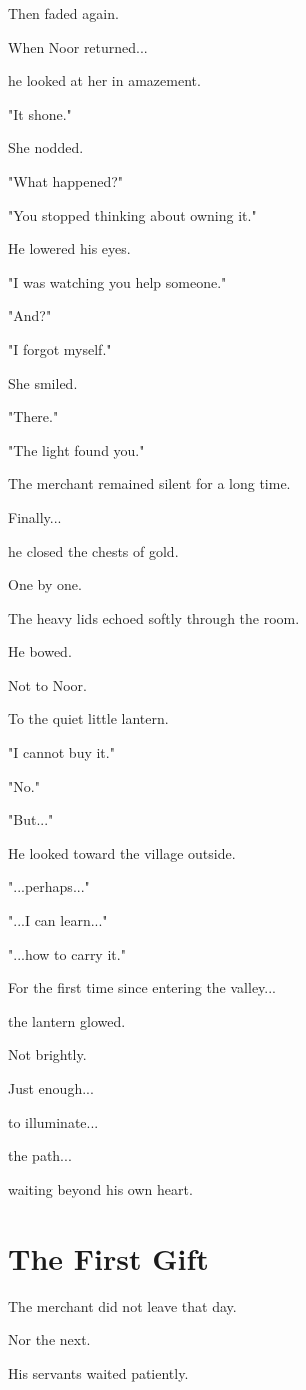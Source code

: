 \documentclass[12pt,openany]{book}
\begin{document}
Then faded again.

When Noor returned...

he looked at her in amazement.

"It shone."

She nodded.

"What happened?"

"You stopped thinking about owning it."

He lowered his eyes.

"I was watching you help someone."

"And?"

"I forgot myself."

She smiled.

"There."

"The light found you."

The merchant remained silent for a long time.

Finally...

he closed the chests of gold.

One by one.

The heavy lids echoed softly through the room.

He bowed.

Not to Noor.

To the quiet little lantern.

"I cannot buy it."

"No."

"But..."

He looked toward the village outside.

"...perhaps..."

"...I can learn..."

"...how to carry it."

For the first time since entering the valley...

the lantern glowed.

Not brightly.

Just enough...

to illuminate...

the path...

waiting beyond his own heart.
\section*{The First Gift}

The merchant did not leave that day.

Nor the next.

His servants waited patiently.
\end{document}
